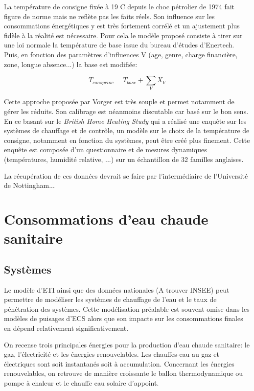 La température de consigne fixée à 19 \degre C depuis le choc pétrolier de 1974 fait figure de norme mais ne reflète pas les faits réels. Son influence sur les consommations énergétiques y est très fortement corrélé et un ajustement plus fidèle à la réalité est nécessaire.
Pour cela le modèle proposé consiste à tirer sur une loi normale la température de base issue du bureau d'études d'Enertech. Puis, en fonction des paramètres d'influences V (age, genre, charge financière, zone, longue absence...) la base est modifiée:

\[T_{consprinc}=T_{base}+\sum_{V}X_{V}\]

Cette approche proposée par Vorger \cite{Vorger-14} est très souple et permet notamment de gérer les réduits. Son calibrage est néanmoins discutable car basé sur le bon sens. En ce basant sur le \textit{British Home Heating Study} qui a réalisé une enquête sur les systèmes de chauffage et de contrôle, un modèle sur le choix de la température de consigne, notamment en fonction du systèmes, peut être créé plus finement. Cette enquête est composée d'un questionnaire et de mesures dynamiques (températures, humidité relative, ...) sur un échantillon de 32 familles anglaises.

La récupération de ces données devrait se faire par l'intermédiaire de l'Université de Nottingham...

\section{Consommations d'eau chaude sanitaire}

\subsection{Systèmes}

Le modèle d'ETI ainsi que des données nationales (A trouver INSEE) peut permettre de modéliser les systèmes de chauffage de l'eau et le taux de pénétration des systèmes. Cette modélisation préalable est souvent omise dans les modèles de puisages d'ECS alors que son impacte sur les consommations finales en dépend relativement significativement.

On recense trois principales énergies pour la production d'eau chaude sanitaire: le gaz, l'électricité et les énergies renouvelables. Les chauffes-eau au gaz et électriques sont soit instantanés soit à accumulation. Concernant les énergies renouvelables, on retrouve de manière croissante le ballon thermodynamique ou pompe à chaleur et le chauffe eau solaire d'appoint.


